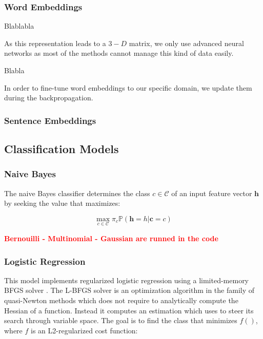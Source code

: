 \documentclass[letterpaper]{article}
\newcommand{\note}[1]{\textbf{\textcolor{red}{#1}}}
\begin{document}
\subsubsection{Word Embeddings}  \label{Word Embeddings}

Blablabla

As this representation leads to a $3-D$ matrix, we only use advanced neural networks as most of the methods cannot manage this kind of data easily.

Blabla

In order to fine-tune word embeddings to our specific domain, we update them during the backpropagation.

\subsubsection{Sentence Embeddings}  \label{Sentence Embeddings}

\subsection{Classification Models}  \label{Classification}

\subsubsection{Naive Bayes}  \label{Naive Bayes}

The naive Bayes classifier determines the class $c \in \mathcal{C}$ of an input feature vector $\mathbf{h}$ by seeking the value that maximizes:

\begin{equation} \label{naive bayes eq}
	\underset{c \in \mathcal{C}}{\max} \pi_c \mathds{P} (\mathbf{h} = h | \mathbf{c} = c)
\end{equation}

\note{Bernouilli - Multinomial - Gaussian are runned in the code}

\subsubsection{Logistic Regression}  \label{Logistic Regression}

This model implements regularized logistic regression using a limited-memory BFGS solver \cite{liu1989limited}. The L-BFGS solver is an optimization algorithm in the family of quasi-Newton methods which does not require to analytically compute the Hessian of a function. Instead it computes an estimation which uses to steer its search through variable space. The goal is to find the class that minimizes $f()$, where $f$ is an L2-regularized cost function:
\end{document}
